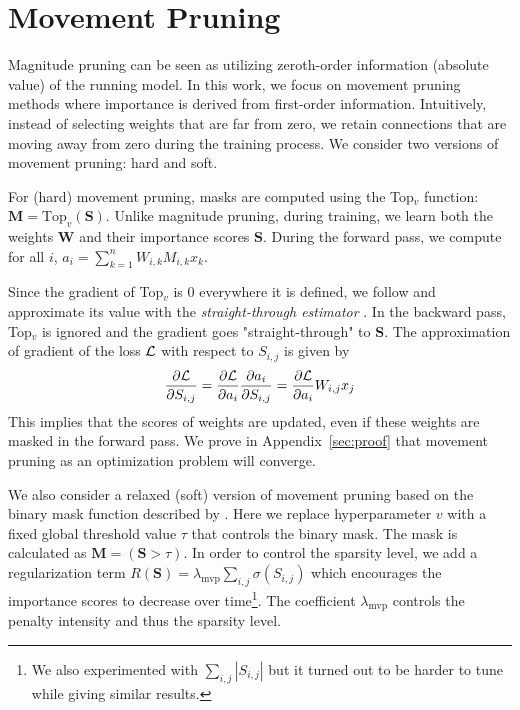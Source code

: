 \documentclass{article}
\begin{document}
\section{Movement Pruning}

Magnitude pruning can be seen as utilizing zeroth-order information (absolute value) of the running model. In this work, 
we focus on movement pruning methods where importance is derived from first-order information. Intuitively,
instead of selecting weights that are far from zero, we retain connections that are moving away from zero during the training process. We consider two versions of movement pruning: hard and soft. 

For (hard) movement pruning, masks are computed using the Top$_v$ function: $\mathbf{M} = \text{Top}_v(\mathbf{S})$. Unlike magnitude pruning, during training, we learn both the weights $\mathbf{W}$ and their importance scores $\mathbf{S}$. During the forward pass, we compute for all $i$, $a_i = \sum_{k=1}^{n}   W_{i,k}   M_{i,k} x_k$.  

Since the gradient of Top$_v$ is 0 everywhere it is defined, we follow \citet{Ramanujan2019WhatsHI, Mallya2018PiggybackAM} and approximate its value with the \textit{straight-through estimator} \citep{Bengio2013EstimatingOP}. In the backward pass, Top$_v$ is ignored and the gradient goes "straight-through" to $\mathbf{S}$. The approximation of gradient of the loss $\cal L$ with respect to $S_{i,j}$ is given by \begin{equation}
    \label{eq:update_S}
    \frac{\partial {\cal L}}{\partial {S}_{i,j}} = \frac{\partial {\cal L}}{\partial {a}_i} \frac{\partial {a}_i}{\partial {S}_{i,j}} = \frac{\partial {\cal L}}{\partial {a}_i} {W}_{i,j} {x}_j
\end{equation}
This implies that the scores of weights are updated, even if these weights are masked in the forward pass. 
We prove in Appendix~\ref{sec:proof} that movement pruning as an optimization problem will converge.

We also consider a relaxed (soft) version of movement pruning based on the binary mask function described by \citet{Mallya2018PiggybackAM}. Here we replace hyperparameter $v$ with a fixed global threshold value $\tau$ that controls the binary mask. The mask is calculated as $\mathbf{M} = (\mathbf{S} > \tau)$. In order to control the sparsity level, we add a regularization term $R(\mathbf{S}) = \lambda_{\text{mvp}} \sum_{i,j} \sigma(S_{i,j})$ which encourages the importance scores to decrease over time\footnote{We also experimented with $\sum_{i,j}|S_{i,j}|$ but it turned out to be harder to tune while giving similar results.}. The coefficient $\lambda_{\text{mvp}}$ controls the penalty intensity and thus the sparsity level.
\end{document}
